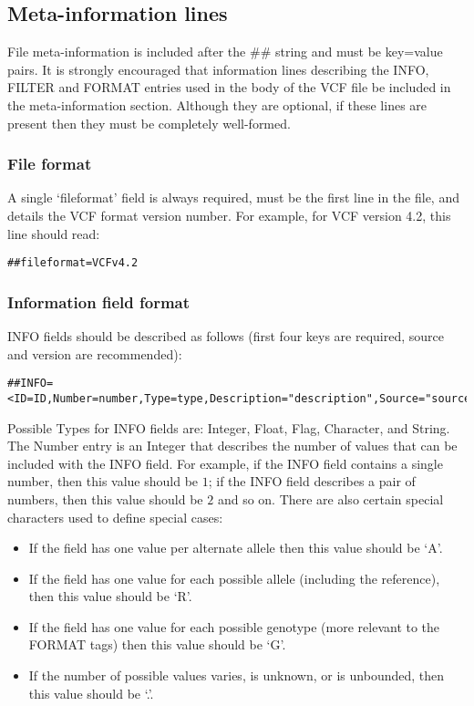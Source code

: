 \documentclass[8pt]{article}
\begin{document}
\subsection{Meta-information lines}
File meta-information is included after the \#\# string and must be key=value pairs. It is strongly encouraged that information lines describing the INFO, FILTER and FORMAT entries used in the body of the VCF file be included in the meta-information section. Although they are optional, if these lines are present then they must be completely well-formed.
\subsubsection{File format}
A single `fileformat' field is always required, must be the first line in the file, and details the VCF format version number. For example, for VCF version 4.2, this line should read:

\begin{verbatim}
##fileformat=VCFv4.2
\end{verbatim}

\subsubsection{Information field format}
INFO fields should be described as follows (first four keys are required, source and version are recommended):

\begin{verbatim}
##INFO=<ID=ID,Number=number,Type=type,Description="description",Source="source",Version="version">
\end{verbatim}

Possible Types for INFO fields are: Integer, Float, Flag, Character, and String. The Number entry is an Integer that describes the number of values that can be included with the INFO field. For example, if the INFO field contains a single number, then this value should be $1$; if the INFO field describes a pair of numbers, then this value should be $2$ and so on. There are also certain special characters used to define special cases:

\begin{itemize}
  \item If the field has one value per alternate allele then this value should be `A'.
  \item If the field has one value for each possible allele (including the reference), then this value should be `R'.
  \item If the field has one value for each possible genotype (more relevant to the FORMAT tags) then this value should be `G'.
  \item If the number of possible values varies, is unknown, or is unbounded, then this value should be `.'.
\end{itemize}
\end{document}
